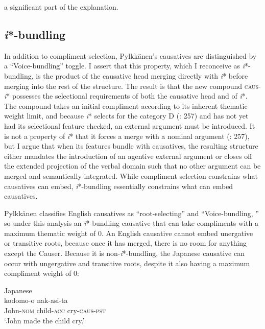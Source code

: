 \documentclass[output=paper,modfonts,nonflat,colorlinks,citecolor=brown]{langsci/langscibook}
\begin{document}
a significant part of the explanation.\\

\subsection{\textit{i}*-bundling}\label{sec:wechsler:2.4}

In addition to compliment selection, Pylkkänen’s causatives are distinguished by a “Voice-bundling” toggle. I assert that this property, which I reconceive as \textit{i}*-bundling, is the product of the causative head merging directly with \textit{i}* before merging into the rest of the structure. The result is that the new compound \textsc{caus}{}-\textit{i}* possesses the selectional requirements of both the causative head and of \textit{i}*. The compound takes an initial compliment according to its inherent thematic weight limit, and because \textit{i}* selects for the category D (\citealt{WoodMarantz2017}: 257) and has not yet had its selectional feature checked, an external argument must be introduced. It is not a property of \textit{i}* that it forces a merge with a nominal argument (\citealt{WoodMarantz2017}: 257), but I argue that when its features bundle with causatives, the resulting structure either mandates the introduction of an agentive external argument or closes off the extended projection of the verbal domain such that no other argument can be merged and semantically integrated. While compliment selection constrains what causatives can embed, \textit{i}*-bundling essentially constrains what can embed causatives. 



Pylkkänen classifies English causatives as “root-selecting” and “Voice-bundling, ” so under this analysis an \textit{i}*-bundling causative that can take compliments with a maximum thematic weight of 0. An English causative cannot embed unergative or transitive roots, because once it has merged, there is no room for anything except the Causer. Because it is non-\textit{i}*-bundling, the Japanese causative can occur with ungergative and transitive roots, despite it also having a maximum compliment weight of 0: 


\ea\label{ex:wechsler:11}
Japanese \citep[120]{Pylkkänen2008}\\
 {kodomo-o} {nak-asi-ta}\\
John-\textsc{nom}  child-\textsc{acc}  cry-\textsc{caus-pst}\\
\glt ‘John made the child cry.'
\z
\end{document}
